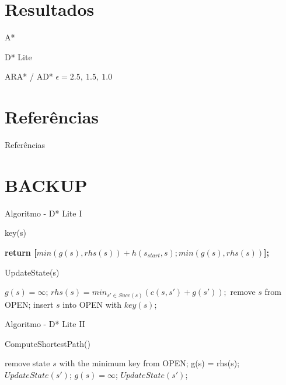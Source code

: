 \documentclass[10pt]{beamer}
\begin{document}
\section{Resultados}
\begin{frame}{A*}

\end{frame}


\begin{frame}{D* Lite}

\end{frame}


\begin{frame}{ARA* / AD* \hfill $\epsilon= 2.5,\: 1.5, \:1.0$}

\end{frame}

\section{Referências}
\begin{frame}[fragile]{Referências}
  
  
\end{frame}


\section{BACKUP}
\begin{frame}{Algoritmo - D* Lite I}
\begin{algorithm}[H]
\caption{key(s)}
\begin{algorithmic}[1]
\State \textbf{return [$min(g(s), rhs(s)) + h(s_{start},s); min(g(s), rhs(s))$];}
\end{algorithmic}
\end{algorithm}
\begin{algorithm}[H]
\caption{UpdateState(s)}
\begin{algorithmic}[1]
    \State $g(s) = \infty$;
\EndIf
{} $rhs(s)=min_{s' \in Succ(s)}(c(s,s') + g(s'));$
\EndIf
{} remove $s$ from OPEN;
\EndIf
{} insert $s$ into OPEN with $key(s)$;
\EndIf
\end{algorithmic}
\end{algorithm}
\end{frame}

\begin{frame}{Algoritmo - D* Lite II}
\begin{algorithm}[H]
\caption{ComputeShortestPath()}
\begin{algorithmic}[1]
\State remove state $s$ with the minimum key from OPEN;
\State g(s) = rhs(s);
 $UpdateState(s')$;
\EndFor
\Else 
\State $g(s) = \infty$;
 $UpdateState(s')$;
\EndFor
\EndIf
\EndWhile
\end{algorithmic}
\end{algorithm}
\end{frame}
\end{document}
